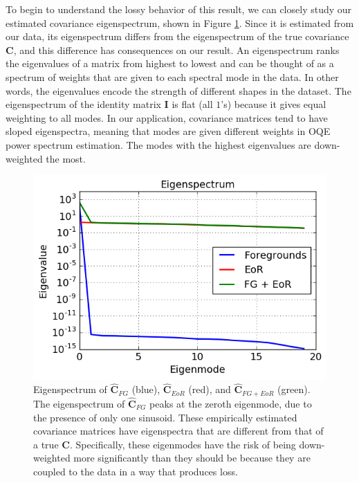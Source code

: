 \documentclass[preprint2,numberedappendix,tighten]{aastex6}  %
\begin{document}
To begin to understand the lossy behavior of this result, we can closely study our estimated covariance eigenspectrum, shown in Figure \ref{fig:toy_sigloss2}. Since it is estimated from our data, its eigenspectrum differs from the eigenspectrum of the true covariance $\textbf{C}$, and this difference has consequences on our result. An eigenspectrum ranks the eigenvalues of a matrix from 
highest to lowest and can be thought of as a spectrum of weights that are given to each spectral mode in the data. In other 
words, the eigenvalues encode the strength of different shapes in the dataset. The eigenspectrum of the identity matrix $
\textbf{I}$ is flat (all $1$'s) because it gives equal weighting to all modes. In our application, covariance matrices tend to have sloped eigenspectra, meaning that modes are given different weights in OQE power spectrum estimation. The modes with the highest eigenvalues are 
down-weighted the most. 

\begin{figure}
	\centering
	\includegraphics[trim={0cm 0cm 0cm 0cm},clip,width=\columnwidth]{plots/toy_sigloss2.png}
	\caption{Eigenspectrum of $\widehat{\textbf{C}}_{FG}$ (blue), $\widehat{\textbf{C}}_{EoR}$ (red), and $\widehat{\textbf{C}}_{FG+EoR}$ 
(green). The eigenspectrum of $\widehat{\textbf{C}}_{FG}$ peaks at the zeroth eigenmode, due to the presence of only one 
sinusoid. These empirically estimated covariance matrices have eigenspectra that are different from that of a true $\textbf{C}$. Specifically, these eigenmodes have the risk of being down-weighted more significantly than they should be because they are coupled to the data in a way that produces loss.}
	\label{fig:toy_sigloss2}
\end{figure}
\end{document}
